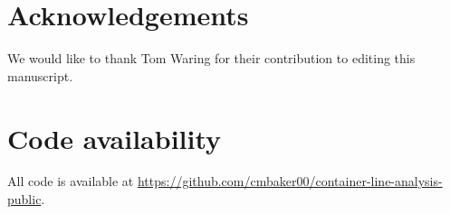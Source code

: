 \documentclass[useAMS,usenatbib,referee]{biom}
\begin{document}
\section*{Acknowledgements}
We would like to thank Tom Waring for their contribution to editing this manuscript.
\section*{Code availability}
All code is available at \url{https://github.com/cmbaker00/container-line-analysis-public}.

%



{}
\label{lastpage}
\end{document}
